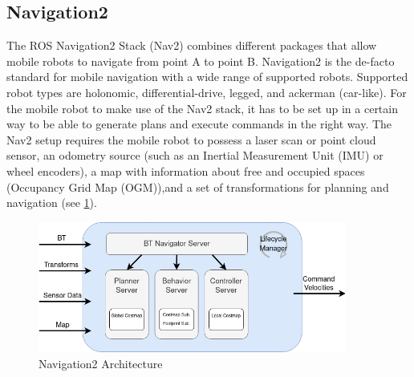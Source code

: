 \begin{table}[ht]
	\centering
	\caption{Turtlebot3 Specifications}
	\label{tab:turtlebot_spec}
	\renewcommand{\arraystretch}{1.5}
\end{table}

\subsection{Navigation2}

The ROS Navigation2 Stack (Nav2) combines different packages that allow mobile robots to navigate from point A to point B. Navigation2 is the de-facto standard for mobile navigation with a wide range of supported robots. Supported robot types are holonomic, differential-drive, legged, and ackerman (car-like). For the mobile robot to make use of the Nav2 stack, it has to be set up in a certain way to be able to generate plans and execute commands in the right way. The Nav2 setup requires the mobile robot to possess a laser scan or point cloud sensor, an odometry source (such as an Inertial Measurement Unit (IMU) or wheel encoders), a map with information about free and occupied spaces (Occupancy Grid Map (OGM)),and a set of transformations for planning and navigation (see \ref{fig:nav_architecture}). 

\begin{figure}[ht]
	\centering
	\includegraphics[width=0.9\textwidth]{images/nav2_architecture.png}
	\caption{Navigation2 Architecture \cite{macenski2020}}
	\label{fig:nav_architecture}
\end{figure}

